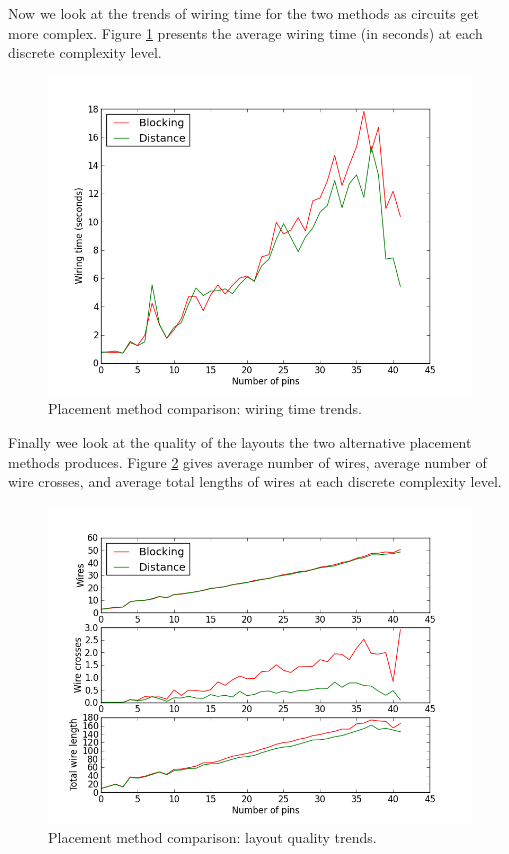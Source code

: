 Now we look at the trends of wiring time for the two methods as circuits get
more complex. Figure \ref{fig:placement_time_trend} presents the average wiring
time (in seconds) at each discrete complexity level.

\begin{figure}[H]
\begin{center}
\includegraphics[width=\textwidth]{Images/placement_time_trend_comparison.png}
\caption{Placement method comparison: wiring time trends.}
\label{fig:placement_time_trend}
\end{center}
\end{figure}

Finally wee look at the quality of the layouts the two alternative placement
methods produces. Figure \ref{fig:placement_quality_trend} gives average number of
wires, average number of wire crosses, and average total lengths of wires at
each discrete complexity level.

\begin{figure}
\begin{center}
\includegraphics[width=\textwidth]{Images/placement_quality_trend_comparison.png}
\caption{Placement method comparison: layout quality trends.}
\label{fig:placement_quality_trend}
\end{center}
\end{figure}

